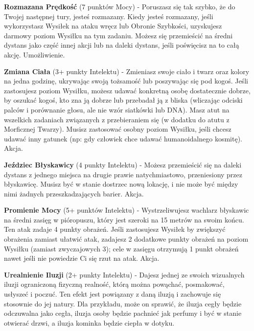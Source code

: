 \textbf{Rozmazana Prędkość}\label{sec:Rozmazana Prędkość} (7 punktów Mocy) - Poruszasz się tak szybko, że do Twojej następnej tury, jesteś rozmazany. Kiedy jesteś rozmazany, jeśli wykorzystasz Wysiłek na ataku wręcz lub Obronie Szybkości, uzyskujesz darmowy poziom Wysiłku na tym zadaniu. Możesz się przemieścić na średni dystans jako część innej akcji lub na daleki dystans, jeśli poświęcisz na to całą akcję. Umożliwienie. 

\textbf{Zmiana Ciała}\label{sec:Zmiana Ciała} (3+ punkty Intelektu) - Zmieniasz swoje ciało i twarz oraz kolory na jedna godzinę, ukrywając swoją tożsamość lub poszywając się pod kogoś. Jeśli zastosujesz poziom Wysiłku, możesz udawać konkretną osobę dostatecznie dobrze, by oszukać kogoś, kto zna ją dobrze lub przebadał ją z bliska (wliczając odciski palców i porównanie głosu, ale nie wzór siatkówki lub DNA). Masz atut na wszelkich zadaniach związanych z przebieraniem się (w dodatku do atutu z Morficznej Twarzy). Musisz zastosować osobny poziom Wysiłku, jeśli chcesz udawać inny gatunek (np: gdy człowiek chce udawać humanoidalnego kosmitę). Akcja.

\textbf{Jeździec Błyskawicy}\label{sec:Jeździec Błyskawicy} (4 punkty Intelektu) - Możesz przemieścić się na daleki dystans z jednego miejsca na drugie prawie natychmiastowo, przeniesiony przez błyskawicę. Musisz być w stanie dostrzec nową lokację, i nie może być między nimi żadnych przeszkadzających barier. Akcja.

\textbf{Promienie Mocy}\label{sec:Promienie Mocy} (5+ punktów Intelektu) - Wystrzeliwujesz wachlarz błyskawic na średni zasięg w pióropuszu, który jest szeroki na 15 metrów na swoim końcu. Ten atak zadaje 4 punkty obrażeń. Jeśli zastosujesz Wysiłek by zwiększyć obrażenia zamiast ułatwić atak, zadajesz 2 dodatkowe punkty obrażeń na poziom Wysiłku (zamiast zwyczajowych 3); cele w zasięgu otrzymują 1 punkt obrażeń nawet jeśli nie powiedzie Ci się rzut na atak. Akcja.

\textbf{Urealnienie Iluzji}\label{sec:Urealnienie Iluzji} (2+ punkty Intelektu) - Dajesz jednej ze swoich wizualnych iluzji ograniczoną fizyczną realność, którą można powąchać, posmakować, usłyszeć i poczuć. Ten efekt jest powiązany z daną iluzją i zachowuje się stosownie do jej natury. Dla przykładu, może on sprawić, że iluzja cegły będzie odczuwalna jako cegła, iluzja osoby będzie pachnieć jak perfumy i być w stanie otwierać drzwi, a iluzja kominka będzie ciepła w dotyku. 

